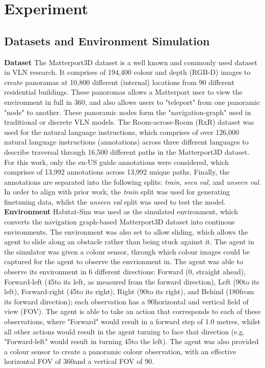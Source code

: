 \documentclass{svproc}
\begin{document}
\section{Experiment}
\subsection{Datasets and Environment Simulation}
    \textbf{Dataset}  The Matterport3D \cite{Matterport3D} dataset is a well known and commonly used dataset in VLN research. It comprises of 194,400 colour and depth (RGB-D) images to create panoramas at 10,800 different (internal) locations from 90 different residential buildings. These panoromas allows a Matterport user to view the environment in full in 360\textdegree, and also allows users to "teleport" from one panoramic "node" to another. These panoramic nodes form the "navigation-graph" used in traditional or discrete VLN models.
    The Room-across-Room (RxR) dataset \cite{mattersim, rxr} was used for the natural language instructions, which comprises of over 126,000 natural language instructions (annotations) across three different languages to describe traversal through 16,500 different paths in the Matterport3D dataset. For this work, only the en-US guide annotations were considered, which comprises of 13,992 annotations across 13,992 unique paths. Finally, the annotations are separated into the following splits: \textit{train}, \textit{seen val}, and \textit{unseen val}. In order to align with prior work, the \textit{train} split was used for generating finetuning data, whilst the \textit{unseen val} split was used to test the model.
    \newline \newline
    \textbf{Environment}  Habitat-Sim \cite{habitat19iccv, szot2021habitat, puig2023habitat3} was used as the simulated environment, which converts the navigation graph-based Matterport3D dataset into continous environments. The environment was also set to allow sliding, which allows the agent to slide along an obstacle rather than being stuck against it. The agent in the simulator was given a colour sensor, through which colour images could be captured for the agent to observe the envrionment in. The agent was able to observe its environment in 6 different directions: Forward (0\textdegree, straight ahead), Forward-left (45\textdegree to its left, as measured from the forward direction), Left (90\textdegree to its left), Forward-right (45\textdegree to its right), Right (90\textdegree to its right), and Behind (180\textdegree from its forward direction); each observation has a 90\textdegree horizontal and vertical field of view (FOV). The agent is able to take an action that corresponds to each of these observations, where "Forward" would result in a forward step of 1.0 metres, whilst all other actions would result in the agent turning to face that direction (e.g. "Forward-left" would result in turning 45\textdegree to the left). The agent was also provided a colour sensor to create a panoramic colour observation, with an effective horizontal FOV of 360\textdegree and a vertical FOV of 90\textdegree.
    
\end{document}
